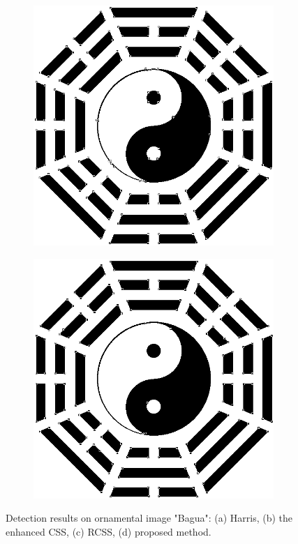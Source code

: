 \documentclass[letterpaper, 10 pt, conference]{ieeeconf}  %
\begin{document}
\begin{figure}[htbp]
\begin{subfigure}[b]{0.49\linewidth}
      \caption{}
    \end{subfigure}
    \begin{subfigure}[b]{0.49\linewidth}
      \includegraphics[width=\linewidth]{experiments/bagua_RCSS.png}
      \caption{}
    \end{subfigure}
     \begin{subfigure}[b]{0.49\linewidth}
      \includegraphics[width=\linewidth]{experiments/bagua_final.png}
      \caption{}
    \end{subfigure}
        \caption{Detection results on ornamental image "Bagua": (a) Harris, (b) the enhanced CSS, (c) RCSS, (d) proposed method.}
    \label{Results on Ornamental Images Bagua}
  \end{figure}
\end{document}

